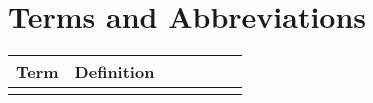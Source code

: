 \thispagestyle{empty}

\section*{Terms and Abbreviations}

\begin{tabular}[h]{rp{0.75\linewidth}}
    \hline
    \textbf{Term} & \textbf{Definition}\\
    \hline
    &\\
    \hline

\end{tabular}
